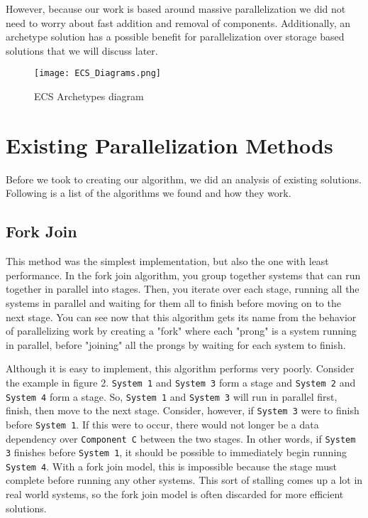 \documentclass[conference]{IEEEtran}
\begin{document}
However, because our work is based around massive parallelization we did not need to worry about fast addition and removal of components. Additionally, an archetype solution has a possible benefit for parallelization over storage based solutions that we will discuss later.
     
\begin{figure}
    \begin{center}
    \centerline{\texttt{[image: ECS\_Diagrams.png]}}
    \caption[test]{ECS Archetypes diagram}
    \label{ECS Archetype}
    \end{center}
\end{figure}

\section{Existing Parallelization Methods}

Before we took to creating our algorithm, we did an analysis of existing solutions. Following is a list of the algorithms we found and how they work.

\subsection{Fork Join}

This method was the simplest implementation, but also the one with least performance. In the fork join algorithm, you group together systems that can run together in parallel into stages. Then, you iterate over each stage, running all the systems in parallel and waiting for them all to finish before moving on to the next stage. You can see now that this algorithm gets its name from the behavior of parallelizing work by creating a "fork" where each "prong" is a system running in parallel, before "joining" all the prongs by waiting for each system to finish. 

Although it is easy to implement, this algorithm performs very poorly. Consider the example in figure 2. \verb|System 1| and \verb|System 3| form a stage and \verb|System 2| and \verb|System 4| form a stage. So, \verb|System 1| and \verb|System 3| will run in parallel first, finish, then move to the next stage. Consider, however, if \verb|System 3| were to finish before \verb|System 1|. If this were to occur, there would not longer be a data dependency over \verb|Component C| between the two stages. In other words, if \verb|System 3| finishes before \verb|System 1|, it should be possible to immediately begin running \verb|System 4|. With a fork join model, this is impossible because the stage must complete before running any other systems. This sort of stalling comes up a lot in real world systems, so the fork join model is often discarded for more efficient solutions.
\end{document}

